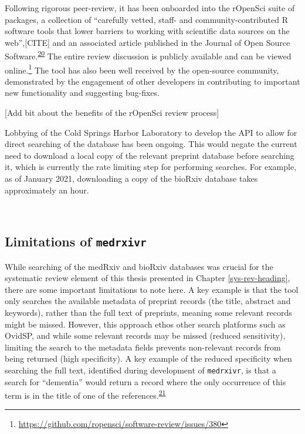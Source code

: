 \documentclass[a4paper, twoside]{templates/ociamthesis}
\begin{document}
Following rigorous peer-review, it has been onboarded into the rOpenSci suite of packages, a collection of ``carefully vetted, staff- and community-contributed R software tools that lower barriers to working with scientific data sources on the web'',{[}CITE{]} and an associated article published in the Journal of Open Source Software.\textsuperscript{\protect\hyperlink{ref-mcguinness2020a}{20}} The entire review discussion is publicly available and can be viewed online.\footnote{\url{https://github.com/ropensci/software-review/issues/380}} The tool has also been well received by the open-source community, demonstrated by the engagement of other developers in contributing to important new functionality and suggesting bug-fixes.

{[}Add bit about the benefits of the rOpenSci review process{]}

Lobbying of the Cold Springs Harbor Laboratory to develop the API to allow for direct searching of the database has been ongoing. This would negate the current need to download a local copy of the relevant preprint database before searching it, which is currently the rate limiting step for performing searches. For example, as of January 2021, downloading a copy of the bioRxiv database takes approximately an hour.

~

\hypertarget{limitations-of-medrxivr}{%
\subsection{\texorpdfstring{Limitations of \texttt{medrxivr}}{Limitations of medrxivr}}\label{limitations-of-medrxivr}}

While searching of the medRxiv and bioRxiv databases was crucial for the systematic review element of this thesis presented in Chapter \ref{sys-rev-heading}, there are some important limitations to note here. A key example is that the tool only searches the available metadata of preprint records (the title, abstract and keywords), rather than the full text of preprints, meaning some relevant records might be missed. However, this approach ethos other search platforms such as OvidSP, and while some relevant records may be missed (reduced sensitivity), limiting the search to the metadata fields prevents non-relevant records from being returned (high specificity). A key example of the reduced specificity when searching the full text, identified during development of \texttt{medrxivr}, is that a search for ``dementia'' would return a record where the only occurrence of this term is in the title of one of the references.\textsuperscript{\protect\hyperlink{ref-bong2019}{21}}
\end{document}
